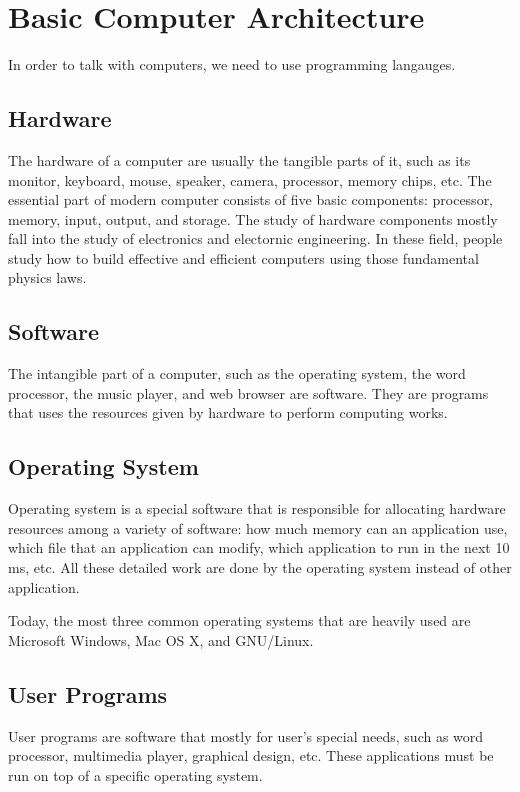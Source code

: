 \documentclass[../main.tex]{subfiles}
\begin{document}
\section{Basic Computer Architecture}
In order to talk with computers, we need to use programming langauges.

\subsection{Hardware}
The hardware of a computer are usually the tangible parts of it, such as its monitor,
keyboard, mouse, speaker, camera, processor, memory chips, etc. The essential part
of modern computer consists of five basic components: processor, memory, input,
output, and storage. The study of hardware components mostly fall into the study
of electronics and electornic engineering. In these field, people study how to
build effective and efficient computers using those fundamental physics laws.

\subsection{Software}
The intangible part of a computer, such as the operating system, the word processor,
the music player, and web browser are software. They are programs that uses
the resources given by hardware to perform computing works.

\subsection{Operating System}
Operating system is a special software that is responsible for allocating hardware
resources among a variety of software: how much memory can an application use,
which file that an application can modify, which application to run in the next
10 ms, etc. All these detailed work are done by the operating system instead
of other application.

Today, the most three common operating systems that are heavily used are Microsoft
Windows, Mac OS X, and GNU/Linux.

\subsection{User Programs}
User programs are software that mostly for user's special needs, such as word
processor, multimedia player, graphical design, etc. These applications must be
run on top of a specific operating system.
\end{document}
